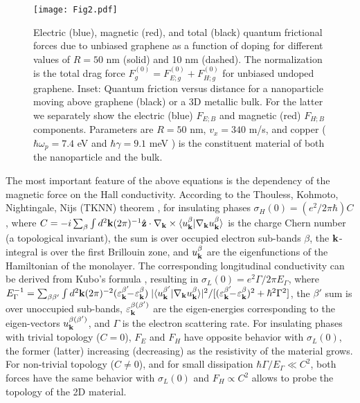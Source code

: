 \documentclass[10pt,aps,prl,superscriptaddress,showpacs,twocolumn]{revtex4-1}
\begin{document}

\begin{figure}%
\centering
\texttt{[image: Fig2.pdf]}
\caption{
Electric (blue), magnetic (red), and total (black) quantum frictional forces  
due to unbiased graphene as a function of doping for different values of $R=50$ nm (solid) and 10 nm (dashed).
The normalization is the total drag force $F^{(0)}_g= F^{(0)}_{E;g}+F^{(0)}_{H;g}$ for unbiased undoped graphene. 
Inset: Quantum friction versus distance for a nanoparticle moving above graphene (black) or a 3D metallic bulk.
For the latter we separately show the electric (blue) $F_{E;B}$ and magnetic (red) $F_{H;B}$ 
components. Parameters are $R=50$ nm, $v_x=340$ m/s, and copper ($\hbar \omega_p= 7.4$ eV and $\hbar \gamma=9.1$ meV \cite{Ordal}) is the constituent material of both the nanoparticle and the bulk.
}
\label{Fig2}
\end{figure}


The most important feature of the above equations is the dependency of the magnetic force on the Hall conductivity. According to the Thouless, Kohmoto, Nightingale, Nijs (TKNN) theorem \cite{Thouless1982}, for insulating phases $\sigma_H(0)= (e^2/2 \pi \hbar) C$,
where $C=-i \sum_{\beta} \int d^2{\bf k} (2 \pi)^{-1} \hat{\bf z} \cdot \nabla_{{\bf k}} \times \langle u_{{\bf k}}^{\beta} |  \nabla_{{\bf k}} u_{{\bf k}}^{\beta} \rangle$ is the charge Chern number (a topological invariant), the sum is over occupied electron sub-bands $\beta$, the ${\bf k}$-integral is over the first Brillouin zone, and $u_{{\bf k}}^{\beta}$ are the eigenfunctions of the Hamiltonian of the monolayer. The corresponding longitudinal conductivity 
can be derived from Kubo's formula
\cite{Kubo1957}, resulting in
$\sigma_L(0) = e^2 \Gamma/ 2 \pi E_{\Gamma}$, where
$E^{-1}_{\Gamma}= \sum_{\beta\beta'} \int d^2{\bf k} (2 \pi)^{-2} 
(\varepsilon^{\beta'}_{{\bf k}} \!\!\!-\! \varepsilon^{\beta}_{{\bf k}}) \; |\langle u_{{\bf k}}^{\beta'} |  \nabla_{{\bf k}} u_{{\bf k}}^{\beta} \rangle   |^2 / [(\varepsilon^{\beta'}_{{\bf k}} \!\!\!-\! \varepsilon^{\beta}_{{\bf k}})^2 + \hbar^2 \Gamma^2]$, the $\beta'$ sum is over unoccupied sub-bands, $\varepsilon^{\beta(\beta')}_{{\bf k}}$
are the eigen-energies corresponding to the eigen-vectors $u_{{\bf k}}^{\beta(\beta')}$,
and $\Gamma$ is the electron scattering rate. For insulating phases with trivial topology ($C=0$), $F_E$ and $F_H$ have opposite behavior with $\sigma_L(0)$, the former (latter) increasing (decreasing) as the resistivity of the material grows. For non-trivial topology 
($C \neq 0$), and for small dissipation $\hbar \Gamma/ E_{\Gamma} \ll C^2$, both forces have the same behavior with $\sigma_L(0)$ and 
$F_H \propto C^2$ allows to probe the topology 
of the 2D material.
\end{document}

